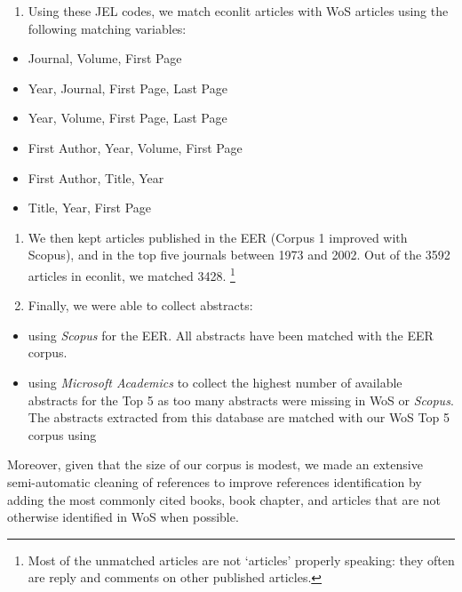 \documentclass[
  12pt,
  onecolumn]{article}
\providecommand{\tightlist}{%
  \setlength{\itemsep}{0pt}\setlength{\parskip}{0pt}}
\begin{document}
\begin{enumerate}
\def\labelenumi{\arabic{enumi}.}
\setcounter{enumi}{1}
\tightlist
\item
  Using these JEL codes, we match econlit articles with WoS articles
  using the following matching variables:
\end{enumerate}

\begin{itemize}
\tightlist
\item
  Journal, Volume, First Page
\item
  Year, Journal, First Page, Last Page
\item
  Year, Volume, First Page, Last Page
\item
  First Author, Year, Volume, First Page
\item
  First Author, Title, Year
\item
  Title, Year, First Page
\end{itemize}

\begin{enumerate}
\def\labelenumi{\arabic{enumi}.}
\setcounter{enumi}{2}
\item
  We then kept articles published in the EER (Corpus 1 improved with
  Scopus), and in the top five journals between 1973 and 2002. Out of
  the 3592 articles in econlit, we matched 3428. \footnote{Most of the
    unmatched articles are not `articles' properly speaking: they often
    are reply and comments on other published articles.}
\item
  Finally, we were able to collect abstracts:
\end{enumerate}

\begin{itemize}
\tightlist
\item
  using \emph{Scopus} for the EER. All abstracts have been matched with
  the EER corpus.
\item
  using \emph{Microsoft Academics} to collect the highest number of
  available abstracts for the Top 5 as too many abstracts were missing
  in WoS or \emph{Scopus}. The abstracts extracted from this database
  are matched with our WoS Top 5 corpus using
\end{itemize}

Moreover, given that the size of our corpus is modest, we made an
extensive semi-automatic cleaning of references to improve references
identification by adding the most commonly cited books, book chapter,
and articles that are not otherwise identified in WoS when possible.
\end{document}
